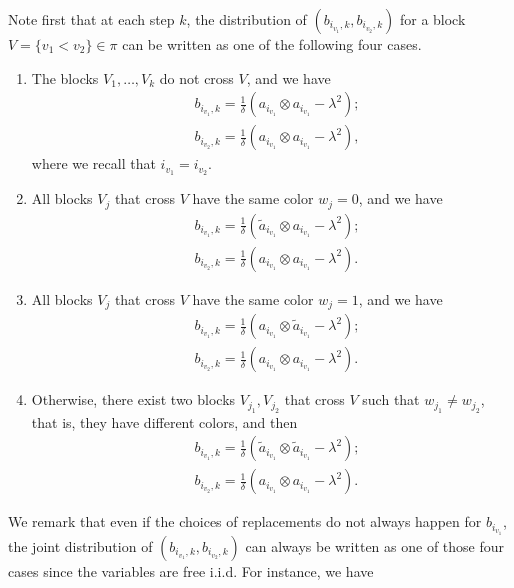 \documentclass[12pt,reqno]{amsart}
\theoremstyle{plain}
\newcommand{\1}{\mathbf{1}}
\begin{document}
Note first that at each step $k$, the distribution of $(b_{i_{v_1},k},b_{i_{v_2},k})$ for a block $V=\{v_1<v_2\} \in \pi$ can be written as one of the following four cases.
\begin{enumerate}
    \item\label{case no crossing} The blocks $V_1,\ldots,V_k$ do not cross $V$, and we have
    \begin{align*}
        &b_{i_{v_1},k}=\frac{1}{\delta}\left(a_{i_{v_1}}\otimes a_{i_{v_1}}-\lambda^2\right);\\
        &b_{i_{v_2},k}=\frac{1}{\delta}\left(a_{i_{v_1}}\otimes a_{i_{v_1}}-\lambda^2\right),
    \end{align*}
    where we recall that $i_{v_1}=i_{v_2}$.
    \item\label{case cross w=0} All blocks $V_j$ that cross $V$ have the same color $w_j=0$, and we have
    \begin{align*}
        &b_{i_{v_1},k}=\frac{1}{\delta}\left(\tilde{a}_{i_{v_1}}\otimes a_{i_{v_1}}-\lambda^2\right);\\
        &b_{i_{v_2},k}=\frac{1}{\delta}\left(a_{i_{v_1}}\otimes a_{i_{v_1}}-\lambda^2\right).
    \end{align*}
    \item\label{case cross w=1} All blocks $V_j$ that cross $V$ have the same color $w_j=1$, and we have
    \begin{align*}
        &b_{i_{v_1},k}=\frac{1}{\delta}\left(a_{i_{v_1}}\otimes \tilde{a}_{i_{v_1}}-\lambda^2\right);\\
        &b_{i_{v_2},k}=\frac{1}{\delta}\left(a_{i_{v_1}}\otimes a_{i_{v_1}}-\lambda^2\right).
    \end{align*}
    \item\label{case cross both w} Otherwise, there exist two blocks $V_{j_1},V_{j_2}$ that cross $V$ such that $w_{j_1}\ne w_{j_2}$, that is, they have different colors, and then
    \begin{align*}
        &b_{i_{v_1},k}=\frac{1}{\delta}\left(\tilde{a}_{i_{v_1}}\otimes \tilde{a}_{i_{v_1}}-\lambda^2\right);\\
        &b_{i_{v_2},k}=\frac{1}{\delta}\left(a_{i_{v_1}}\otimes a_{i_{v_1}}-\lambda^2\right).
    \end{align*}
\end{enumerate}
We remark that even if the choices of replacements do not always happen for $b_{i_{v_1}}$, the joint distribution of $(b_{i_{v_1},k},b_{i_{v_2},k})$ can always be written as one of those four cases since the variables are free i.i.d. For instance, we have
\end{document}
